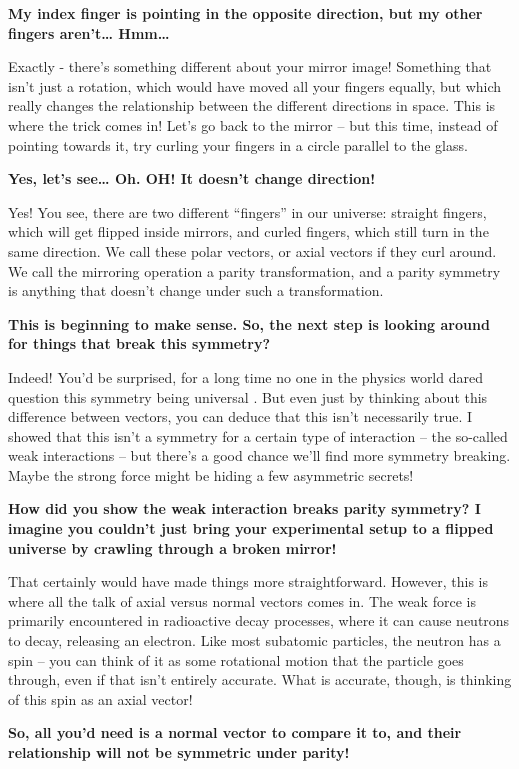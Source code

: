 \documentclass{article}
\newcommand{\q}[1]{\vspace{10pt}
\textbf{#1}
\vspace{0pt}}
\begin{document}
\begin{multicols}{2}
\q{My index finger is pointing in the opposite direction, but my other fingers aren’t… Hmm…}

Exactly - there’s something different about your mirror image! Something that isn’t just a rotation, which would have moved all your fingers equally, but which really changes the relationship between the different directions in space. This is where the trick comes in! Let’s go back to the mirror – but this time, instead of pointing towards it, try curling your fingers in a circle parallel to the glass.

\q{Yes, let’s see… Oh. OH! It doesn’t change direction!}

Yes! You see, there are two different “fingers” in our universe: straight fingers, which will get flipped inside mirrors, and curled fingers, which still turn in the same direction. We call these polar vectors, or axial vectors if they curl around. We call the mirroring operation a parity transformation, and a parity symmetry is anything that doesn’t change under such a transformation.

\q{This is beginning to make sense. So, the next step is looking around for things that break this symmetry?}

Indeed! You’d be surprised, for a long time no one in the physics world dared question this symmetry being universal \cite{N7}. But even just by thinking about this difference between vectors, you can deduce that this isn’t necessarily true. I showed that this isn’t a symmetry for a certain type of interaction – the so-called weak interactions – but there’s a good chance we’ll find more symmetry breaking. Maybe the strong force might be hiding a few asymmetric secrets!

\q{How did you show the weak interaction breaks parity symmetry? I imagine you couldn’t just bring your experimental setup to a flipped universe by crawling through a broken mirror!}

That certainly would have made things more straightforward. However, this is where all the talk of axial versus normal vectors comes in. The weak force is primarily encountered in radioactive decay processes, where it can cause neutrons to decay, releasing an electron. Like most subatomic particles, the neutron has a spin – you can think of it as some rotational motion that the particle goes through, even if that isn’t entirely accurate. What is accurate, though, is thinking of this spin as an axial vector!

\q{So, all you’d need is a normal vector to compare it to, and their relationship will not be symmetric under parity!}


\end{multicols}
\end{document}
